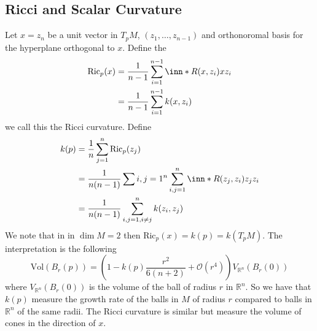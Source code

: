 \documentclass[a4paper]{article}
\begin{document}
\subsection*{Ricci and Scalar Curvature}%
Let $x = z_n$ be a unit vector in $T_pM$, $(z_1, \dots, z_{n-1})$ and orthonoromal basis for the hyperplane orthogonal to $x$. Define the
\[
  \begin{aligned}
    \text{Ric}_p(x) &= \frac{1}{n-1} \sum_{i=1}^{n-1} \inn*{R(x,z_i)x}{z_i}  \\
                    &= \frac{1}{n-1} \sum_{i=1}^{n-1} k(x,z_i)
  \end{aligned}
\]
we call this the Ricci curvature. Define
\[
  \begin{aligned} 
    k(p) &= \frac{1}{n} \sum_{j=1}^n \text{Ric}_p (z_j) \\
         &= \frac{1}{n(n-1)} \sum{i,j=1}^n  \sum_{i,j=1}^n \inn*{R(z_j,z_i)z_j}{z_i} \\
         &= \frac{1}{n(n-1)} \sum_{i,j=1, i\neq j}^n k(z_i,z_j)
  \end{aligned}
\]
We note that in in $\dim M =2$ then $\text{Ric}_p(x) = k(p) = k(T_pM)$. The interpretation is the following
\[
  \text{Vol}(B_r(p)) = \left(1 - k(p) \frac{r^2}{6(n+2)} + \mathcal{O}(r^4)\right) V_{\mathds{R}^n}(B_r(0))
\]
where $V_{\mathds{R}^n}(B_r(0))$ is the volume of the ball of radius $r$ in $\mathds{R}^n$. So we have that $k(p)$ measure the growth rate of the balls in $M$ of radius $r$ compared to balls in $\mathds{R}^n$ of the same radii. The Ricci curvature is similar but measure the volume of cones in the direction of $x$.
\end{document}
